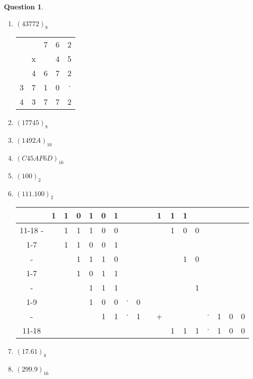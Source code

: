 \documentclass[11pt,a4paper]{article}
\theoremstyle{definition}%
\newtheorem{Q}{Question}[] %
\begin{document}
\begin{Q}
{\begin{enumerate}
		\item $(43772)_8$

		\begin{tabular}{ccccc}
		&& 7 & 6 & 2 \\
		& x & & 4 & 5 \\ \hline
		& 4 & 6 & 7 & 2 \\
		3 & 7 & 1 & 0 & $\cdot$ \\ \hline
		4 & 3 & 7 & 7 & 2 \\
		\end{tabular}

		\item $(17745)_8$
		\item $(1492A)_{16}$
		\item $(C45AF6D)_{16}$
		\item $(100)_2$
		\item $(111.100)_2$

		\begin{tabular}{cccccccccccccccccc}
		  & 1 & 1 & 0 & 1 & 0 & 1 &         &   & \multicolumn{1}{c|}{} & 1 & 1 & 1 &         &   &   &   &   \\ \cline{11-18}
		- &   & 1 & 1 & 1 & 0 & 0 &         &   & \multicolumn{1}{c|}{} &   & 1 & 0 & 0 &         &   &   &   \\ \cline{1-7}
		  &   & 1 & 1 & 0 & 0 & 1 &         &   & \multicolumn{1}{c|}{} &   &   &   &   &         &   &   &   \\
		- &   &   & 1 & 1 & 1 & 0 &         &   & \multicolumn{1}{c|}{} &   &   & 1 & 0 &         &   &   &   \\ \cline{1-7}
		  &   &   & 1 & 0 & 1 & 1 &         &   & \multicolumn{1}{c|}{} &   &   &   &   &         &   &   &   \\
		- &   &   &   & 1 & 1 & 1 &         &   & \multicolumn{1}{c|}{} &   &   &   & 1 &         &   &   &   \\\cline{1-9}
		  &   &   &   & 1 & 0 & 0 & $\cdot$ & 0 & \multicolumn{1}{c|}{} &   &   &   &   &         &   &   &   \\
		- &   &   &   &   & 1 & 1 & $\cdot$ & 1 &                       & + &   &   &   & $\cdot$ & 1 & 0 & 0 \\ \cline{11-18}
		  &   &   &   &   &   &   &         &   &                       &   & 1 & 1 & 1 & $\cdot$ & 1 & 0 & 0 \\
		\end{tabular}

		\item $(17.61)_8$
		\item $(299.9)_{16}$
	\end{enumerate}
}
\end{Q}
\end{document}
